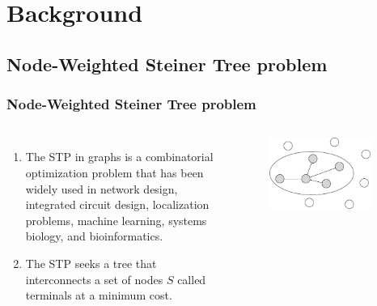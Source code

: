 \documentclass[aspectratio=169]{beamer}
\begin{document}
\section[Background]{Background}
\subsection[STP]{Node-Weighted Steiner Tree problem}

\begin{frame}
\frametitle{Node-Weighted Steiner Tree problem}
  \begin{columns}
    \begin{enumerate}
      \item The STP in graphs is a combinatorial optimization problem that has been widely used in network design, integrated circuit design, localization problems, machine learning, systems biology, and bioinformatics\cite{ljubic2021solving}.
      \item The STP seeks a tree that interconnects a set of nodes $S$ called terminals at a minimum cost.
    \end{enumerate}
    \begin{figure}[ht]
      \centering
      \includegraphics[width=0.9\textwidth]{images/STP.pdf}
    \end{figure}
  \end{columns}
\end{frame}
\end{document}
